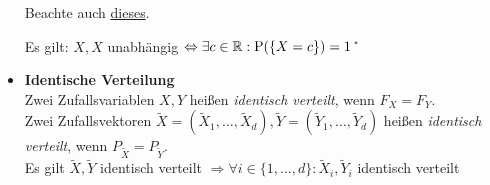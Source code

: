 \begin{itemize}
Beachte auch \hyperlink{unabhaengig}{dieses}.

Es gilt: $X,X$ unabhängig $\Leftrightarrow\exists c\in\mathbb{R}:\operatorname{P}(\{X=c\})=1$ \U

\item 
\textbf{Identische Verteilung}\\
Zwei Zufallsvariablen $X,Y$ heißen \textit{identisch verteilt}, wenn $F_X=F_Y$.\\
Zwei Zufallsvektoren $\tilde{X}=(\tilde{X}_1,\ldots,\tilde{X}_d),
\tilde{Y}=(\tilde{Y}_1,\ldots,\tilde{Y}_d)$ heißen \textit{identisch verteilt}, wenn
$P_{\tilde{X}}=P_{\tilde{Y}}$.\\
Es gilt $\tilde{X},\tilde{Y}$ identisch verteilt
$\Rightarrow\forall i\in\{1,\ldots,d\}: \tilde{X}_i,\tilde{Y}_i$ identisch verteilt

\end{itemize}

